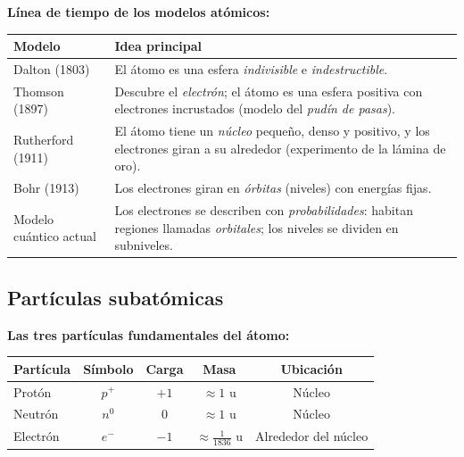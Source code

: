 \documentclass[12pt, letterpaper]{article}
\begin{document}
\begin{cuadroteoria}
  \textbf{Línea de tiempo de los modelos atómicos:}
  \begin{center}
    \begin{tabular}{p{2.6cm}p{9.5cm}}
      \toprule
      \textbf{Modelo}        & \textbf{Idea principal}                                                                                                                  \\
      \midrule
      Dalton (1803)          & El átomo es una esfera \emph{indivisible} e \emph{indestructible}.                                                                       \\
      Thomson (1897)         & Descubre el \emph{electrón}; el átomo es una esfera positiva con electrones incrustados (modelo del \emph{pudín de pasas}).              \\
      Rutherford (1911)      & El átomo tiene un \emph{núcleo} pequeño, denso y positivo, y los electrones giran a su alrededor (experimento de la lámina de oro).      \\
      Bohr (1913)            & Los electrones giran en \emph{órbitas} (niveles) con energías fijas.                                                                     \\
      Modelo cuántico actual & Los electrones se describen con \emph{probabilidades}: habitan regiones llamadas \emph{orbitales}; los niveles se dividen en subniveles. \\
      \bottomrule
    \end{tabular}
  \end{center}
\end{cuadroteoria}

\subsection{Partículas subatómicas}

\begin{cuadroteoria}
  \textbf{Las tres partículas fundamentales del átomo:}
  \begin{center}
    \begin{tabular}{lcccc}
      \toprule
      Partícula & Símbolo & Carga & Masa                       & Ubicación            \\
      \midrule
      Protón    & $p^{+}$ & $+1$  & $\approx 1$ u              & Núcleo               \\
      Neutrón   & $n^{0}$ & $0$   & $\approx 1$ u              & Núcleo               \\
      Electrón  & $e^{-}$ & $-1$  & $\approx \frac{1}{1836}$ u & Alrededor del núcleo \\
      \bottomrule
    \end{tabular}
  \end{center}
\end{cuadroteoria}
\end{document}
